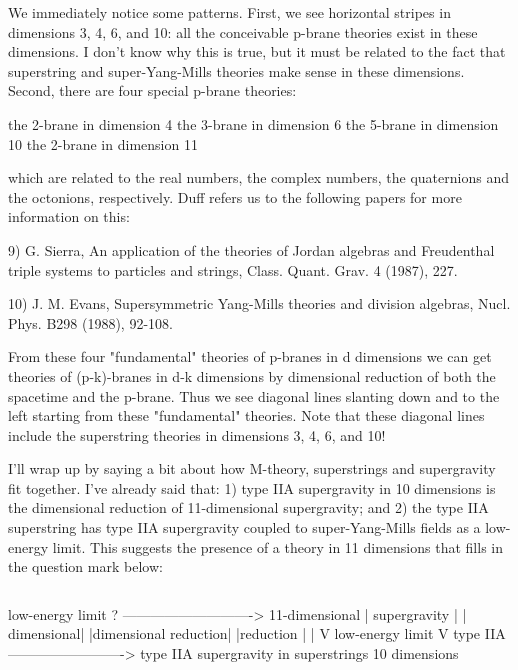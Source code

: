 We immediately notice some patterns.  First, we see horizontal stripes
in dimensions 3, 4, 6, and 10: all the conceivable p-brane theories
exist in these dimensions.  I don't know why this is true, but it must be
related to the fact that superstring and super-Yang-Mills theories make
sense in these dimensions.  Second, there are four special p-brane
theories:

the 2-brane in dimension 4
the 3-brane in dimension 6
the 5-brane in dimension 10
the 2-brane in dimension 11

which are related to the real numbers, the complex numbers, the
quaternions and the octonions, respectively.  Duff refers us to the
following papers for more information on this:

9) G. Sierra, An application of the theories of Jordan algebras and
Freudenthal triple systems to particles and strings, Class. Quant. 
Grav. 4 (1987), 227.

10) J. M. Evans, Supersymmetric Yang-Mills theories and division
algebras, Nucl. Phys. B298 (1988), 92-108.

From these four "fundamental" theories of p-branes in d dimensions we
can get theories of (p-k)-branes in d-k dimensions by dimensional
reduction of both the spacetime and the p-brane.  Thus we see diagonal
lines slanting down and to the left starting from these "fundamental"
theories.  Note that these diagonal lines include the superstring
theories in dimensions 3, 4, 6, and 10!

I'll wrap up by saying a bit about how M-theory, superstrings and
supergravity fit together.  I've already said that: 1) type IIA
supergravity in 10 dimensions is the dimensional reduction of
11-dimensional supergravity; and 2) the type IIA superstring has type
IIA supergravity coupled to super-Yang-Mills fields as a low-energy
limit.  This suggests the presence of a theory in 11 dimensions that
fills in the question mark below:


$$

                      low-energy limit
           ?  ----------------------------> 11-dimensional 
           |                                 supergravity
           |                                    |
dimensional|                                    |dimensional 
  reduction|                                    |reduction
           |                                    |
           V          low-energy limit          V
        type IIA  -------------------------> type IIA supergravity in 
      superstrings                             10 dimensions 

